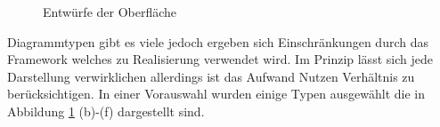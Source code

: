 \begin{figure}[htbp]
\hfill
{}
\caption{Entwürfe der Oberfläche}
\label{konzept_darstellung}
\end{figure}

Diagrammtypen gibt es viele jedoch ergeben sich Einschränkungen durch das Framework welches zu Realisierung verwendet wird. Im Prinzip lässt sich jede Darstellung verwirklichen allerdings ist das Aufwand Nutzen Verhältnis zu berücksichtigen. In einer Vorauswahl wurden einige Typen ausgewählt die in Abbildung \ref{konzept_darstellung} (b)-(f) dargestellt sind. 


